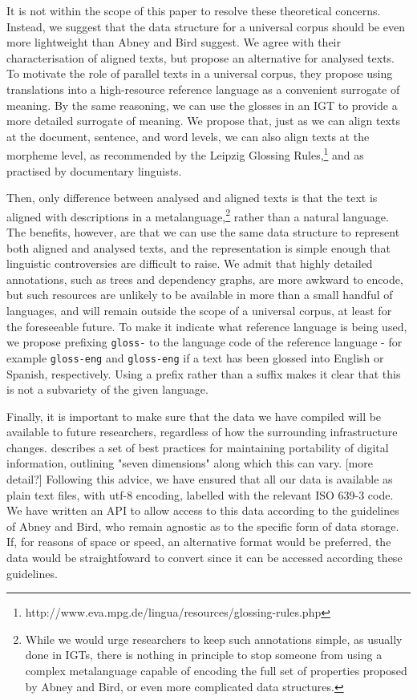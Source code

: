 It is not within the scope of this paper to resolve these theoretical concerns. Instead, we suggest that the data structure for a universal corpus should be even more lightweight than Abney and Bird suggest. We agree with their characterisation of aligned texts, but propose an alternative for analysed texts. To motivate the role of parallel texts in a universal corpus, they propose using translations into a high-resource reference language as a convenient surrogate of meaning. By the same reasoning, we can use the glosses in an IGT to provide a more detailed surrogate of meaning. We propose that, just as we can align texts at the document, sentence, and word levels, we can also align texts at the morpheme level, as recommended by the Leipzig Glossing Rules,\footnote{http://www.eva.mpg.de/lingua/resources/glossing-rules.php} and as practised by documentary linguists.

Then, only difference between analysed and aligned texts is that the text is aligned with descriptions in a metalanguage,\footnote{While we would urge researchers to keep such annotations simple, as usually done in IGTs, there is nothing in principle to stop someone from using a complex metalanguage capable of encoding the full set of properties proposed by Abney and Bird, or even more complicated data structures.} rather than a natural language. The benefits, however, are that we can use the same data structure to represent both aligned and analysed texts, and the representation is simple enough that linguistic controversies are difficult to raise. We admit that highly detailed annotations, such as trees and dependency graphs, are more awkward to encode, but such resources are unlikely to be available in more than a small handful of languages, and will remain outside the scope of a universal corpus, at least for the foreseeable future. To make it indicate what reference language is being used, we propose prefixing \texttt{gloss-} to the language code of the reference language - for example \texttt{gloss-eng} and \texttt{gloss-eng} if a text has been glossed into English or Spanish, respectively. Using a prefix rather than a suffix makes it clear that this is not a subvariety of the given language.

Finally, it is important to make sure that the data we have compiled will be available to future researchers, regardless of how the surrounding infrastructure changes.  describes a set of best practices for maintaining portability of digital information, outlining "seven dimensions" along which this can vary. [more detail?] Following this advice, we have ensured that all our data is available as plain text files, with utf-8 encoding, labelled with the relevant ISO 639-3 code. We have written an API to allow access to this data according to the guidelines of Abney and Bird, who remain agnostic as to the specific form of data storage. If, for reasons of space or speed, an alternative format would be preferred, the data would be straightfoward to convert since it can be accessed according these guidelines.

